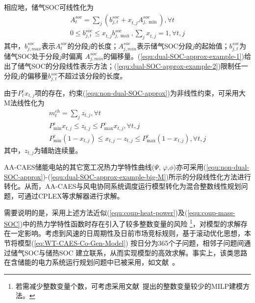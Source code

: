 相应地，储气SOC可线性化为\cite{CAES-Wind-Rui-19}
\begin{subequations}
\label{equ:dual-SOC-approx-example}
\begin{gather}
A_t^{soc} = \sum\limits_j {({b_{j,t}^{soc} + x_{t,j}^{}A_{j,\min }^{soc}})}, \forall t \label{equ:dual-SOC-approx-example-1} \\
0 \le b_{j,t}^{soc} \le x_{t,j}^{}b_{j,\max }^{soc},\sum\limits_j {x_{t,j}^{}}  = 1, \forall t, j \label{equ:dual-SOC-approx-example-2}
\end{gather}
\end{subequations}
其中，$b_{j,max}^{soc}$表示$A_t^{soc}$的分段$j$的长度；$A_{j,min}^{soc}$表示储气SOC分段$j$的起始值；$b_{j,t}^{soc}$为储气SOC处于分段$j$时偏离 $A_{j,min}^{soc}$的偏移量。(\ref{equ:dual-SOC-approx-example-1})给出了储气SOC的分段线性表示方法；(\ref{equ:dual-SOC-approx-example-2})限制任一分段$j$的偏移量$b_{j,t}^{soc}$不超过该分段的长度。

由于$P_t^cx_{t,j}$项的存在，约束(\ref{equ:non-dual-SOC-approx})为非线性约束，可采用大M法线性化为\cite{CAES-Wind-Rui-19}
\begin{subequations}
\label{equ:dual-SOC-approx-example-big-M}
\begin{gather}
m_t^{ch} = \sum\limits_j {z_{t,j}}, \forall t \\
P_{\min }^c{x_{t,j}} \le {z_{t,j}} \le P_{\max }^c{x_{t,j}}, \forall t, j\\
P_{\min }^c({1 - {x_{t,j}}})\le {x_{t,j}} - {z_{t,j}} \le P_{\max }^c({1 - {x_{t,j}}}), \forall t,j
\end{gather}
\end{subequations}
其中，$z_{t,j}$为辅助连续量。

AA-CAES储能电站的其它宽工况热力学特性曲线($\Psi$, $\varphi$,$\phi$)亦可采用(\ref{equ:non-dual-SOC-approx})-(\ref{equ:dual-SOC-approx-example-big-M})所示的分段线性化方法进行转化\cite{CAES-Wind-Rui-19}。从而，AA-CAES与风电协同系统调度运行模型转化为混合整数线性规划问题，可通过CPLEX等求解器进行求解。

需要说明的是，采用上述方法近似(\ref{equ:coup-heat-power})及(\ref{equ:coup-mass-SOC})中的热力学特性函数时存在引入了较多整数变量的风险
\footnote{若需减少整数变量个数，可考虑采用文献~提出的整数变量较少的MILP建模方法。}，对模型的求解存在一定影响。考虑到风速的日周期性及日前市场竞标规则，基于滚动优化思想，本节将模型(\ref{eq:WT-CAES-Co-Gen-Model}) 按日分为365个子问题，相邻子问题间通过储气SOC与储热SOC 建立联系，从而实现模型的高效求解\cite{CAES-Wind-Rui-19}。事实上，该类思路在含储能的电力系统运行规划问题中已被采用，如文献~。


